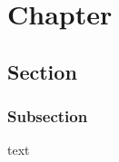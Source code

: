 \documentclass{ltjreport}
\begin{document}
\tableofcontents

\chapter{Chapter} %
\section{Section}
\subsection{Subsection}
text
\end{document}
